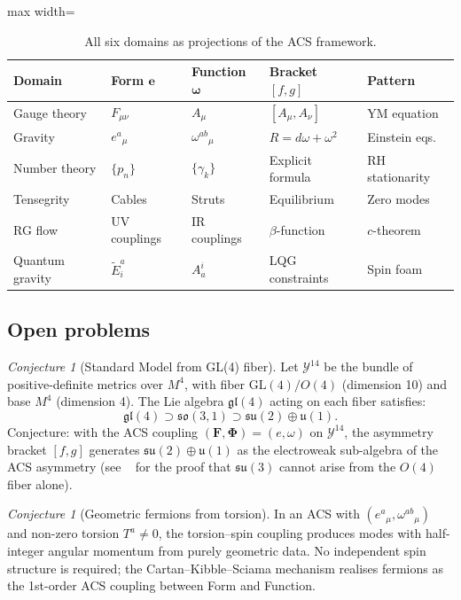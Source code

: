 \documentclass[11pt,a4paper]{article}
\theoremstyle{plain}
\theoremstyle{definition}
\theoremstyle{remark}
\newtheorem{conjecture}[theorem]{Conjecture}
\newcommand{\FormF}{\mathbf{F}}
\newcommand{\FuncF}{\boldsymbol{\Phi}}
\providecommand{\Form}{\mathbf{e}}
\providecommand{\Func}{\boldsymbol{\omega}}
\begin{document}
\begin{table}[h]
\centering
\begin{adjustbox}{max width=\linewidth}\begin{tabular}{lllll}
\toprule
Domain & Form $\Form$ & Function $\Func$ & Bracket $[f,g]$ & Pattern \\
\midrule
Gauge theory & $F_{\mu\nu}$ & $A_\mu$ & $[A_\mu, A_\nu]$ & YM equation \\
Gravity & $e^a{}_\mu$ & $\omega^{ab}{}_\mu$ & $R = d\omega + \omega^2$ & Einstein eqs.\ \\
Number theory & $\{p_n\}$ & $\{\gamma_k\}$ & Explicit formula & RH stationarity \\
Tensegrity & Cables & Struts & Equilibrium & Zero modes \\
RG flow & UV couplings & IR couplings & $\beta$-function & $c$-theorem \\
Quantum gravity & $\tilde{E}^a_i$ & $A^i_a$ & LQG constraints & Spin foam \\
\bottomrule
\end{tabular}\end{adjustbox}
\caption{All six domains as projections of the ACS framework.}
\end{table}

\subsection{Open problems}

\begin{conjecture}[Standard Model from GL(4) fiber]\label{conj:SM}
Let $\mathcal{Y}^{14}$ be the bundle of positive-definite metrics over $M^4$, 
with fiber $\mathrm{GL}(4)/O(4)$ (dimension 10) and base $M^4$ (dimension 4).  
The Lie algebra $\mathfrak{gl}(4)$ acting on each fiber satisfies:
\[
  \mathfrak{gl}(4) \supset \mathfrak{so}(3,1) \supset 
  \mathfrak{su}(2) \oplus \mathfrak{u}(1).
\]
Conjecture: with the ACS coupling $(\FormF, \FuncF) = (e, \omega)$ on 
$\mathcal{Y}^{14}$, the asymmetry bracket $[f, g]$ generates 
$\mathfrak{su}(2) \oplus \mathfrak{u}(1)$ 
as the electroweak sub-algebra of the ACS asymmetry 
(see ~\cite{Wallace2026a} for the proof that $\mathfrak{su}(3)$ 
cannot arise from the $O(4)$ fiber alone).
\end{conjecture}

\begin{conjecture}[Geometric fermions from torsion]\label{conj:fermions}
In an ACS with $(e^a{}_\mu, \omega^{ab}{}_\mu)$ and non-zero torsion 
$T^a \neq 0$, the torsion--spin coupling produces modes with half-integer 
angular momentum from purely geometric data.  No independent spin structure 
is required; the Cartan--Kibble--Sciama mechanism realises fermions as the 
1st-order ACS coupling between Form and Function.
\end{conjecture}
\end{document}

